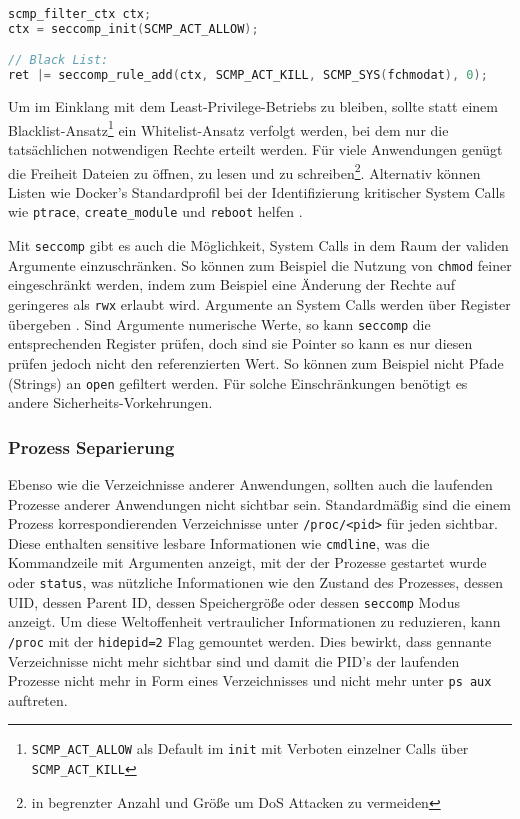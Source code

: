 \begin{lstlisting}[language=c]
scmp_filter_ctx ctx;
ctx = seccomp_init(SCMP_ACT_ALLOW);

// Black List:
ret |= seccomp_rule_add(ctx, SCMP_ACT_KILL, SCMP_SYS(fchmodat), 0); 
\end{lstlisting}

Um im Einklang mit dem Least-Privilege-Betriebs zu bleiben, sollte statt einem Blacklist-Ansatz\footnote{\texttt{SCMP\_ACT\_ALLOW} als Default im \texttt{init} mit Verboten einzelner Calls über \texttt{SCMP\_ACT\_KILL}} ein Whitelist-Ansatz verfolgt werden, bei dem nur die tatsächlichen notwendigen Rechte erteilt werden. Für viele Anwendungen genügt die Freiheit Dateien zu öffnen, zu lesen und zu schreiben\footnote{in begrenzter Anzahl und Größe um DoS Attacken zu vermeiden}.
Alternativ können Listen wie Docker's Standardprofil bei der Identifizierung kritischer System Calls wie \texttt{ptrace}, \texttt{create\_module} und \texttt{reboot} helfen \cite{docker-seccomp}. 

Mit \texttt{seccomp} gibt es auch die Möglichkeit, System Calls in dem Raum der validen Argumente einzuschränken. So können zum Beispiel die Nutzung von \texttt{chmod} feiner eingeschränkt werden, indem zum Beispiel eine Änderung der Rechte auf geringeres als \texttt{rwx} erlaubt wird. Argumente an System Calls werden über Register übergeben \cite{man-syscall}. Sind Argumente numerische Werte, so kann \texttt{seccomp} die entsprechenden Register prüfen,
doch sind sie Pointer so kann es nur diesen prüfen jedoch nicht den referenzierten Wert. So können zum Beispiel nicht Pfade (Strings) an \texttt{open} gefiltert werden. Für solche Einschränkungen benötigt es andere Sicherheits-Vorkehrungen.

\subsubsection{Prozess Separierung}

Ebenso wie die Verzeichnisse anderer Anwendungen, sollten auch die laufenden Prozesse anderer Anwendungen nicht sichtbar sein. Standardmäßig sind die einem Prozess korrespondierenden Verzeichnisse unter \texttt{/proc/<pid>} für jeden sichtbar. Diese enthalten sensitive lesbare Informationen wie \texttt{cmdline}, was die Kommandzeile mit Argumenten anzeigt, mit der der Prozesse gestartet wurde oder \texttt{status}, was nützliche Informationen wie den Zustand des Prozesses, dessen
UID, dessen Parent ID, dessen Speichergröße oder dessen \texttt{seccomp} Modus anzeigt. Um diese Weltoffenheit vertraulicher Informationen zu reduzieren, kann \texttt{/proc} mit der \texttt{hidepid=2} Flag gemountet werden. Dies bewirkt, dass gennante Verzeichnisse nicht mehr sichtbar sind und damit die PID's der laufenden Prozesse nicht mehr in Form eines Verzeichnisses und nicht mehr unter \texttt{ps aux} auftreten. 


